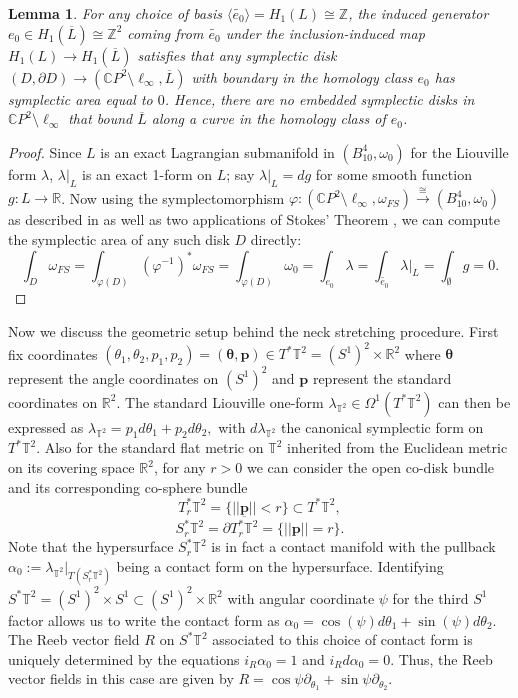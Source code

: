 \documentclass[10pt]{amsart}
\theoremstyle{plain}
\newtheorem{lemma}[thm]{Lemma}
\theoremstyle{definition}
\numberwithin{equation}{section}
\newcommand{\Z}{\mathbb{Z}}
\newcommand{\R}{\mathbb{R}}
\newcommand{\C}{\mathbb{C}}
\newcommand{\sse}{\subset}
\newcommand{\sm}{\setminus}
\newcommand{\wt}{\widetilde}
\begin{document}
\begin{lemma}\label{lem:exactgen}
    For any choice of basis $\langle \wt{e_0}\rangle =H_1(L)\cong \Z$, the induced generator $e_0\in H_1(\overline{L})\cong \Z^2$ coming from $\wt{e_0}$ under the inclusion-induced map $H_1(L)\to H_1(\overline{L})$ satisfies that any symplectic disk $(D,\partial D)\to (\C P^2\sm \ell_{\infty}, \overline{L})$ with boundary in the homology class $e_0$ has symplectic area equal to $0$. Hence, there are no embedded symplectic disks in $\C P^2\sm \ell_{\infty}$ that bound $\overline{L}$ along a curve in the homology class of $e_0$.
\end{lemma}

\begin{proof}
    Since $L$ is an exact Lagrangian submanifold in $(B^4_{10},\omega_0)$ for the Liouville form $\lambda$, $\lambda|_L$ is an exact 1-form on $L$; say $\lambda|_L = dg$ for some smooth function $g:L\to \R$. Now using the symplectomorphism $\varphi:(\C P^2\sm \ell_\infty,\omega_{FS})\overset{\cong}{\to} (B^4_{10}, \omega_0)$ as described in  as well as two applications of Stokes' Theorem \cite{Spivak79_DiffGeo}, we can compute the symplectic area of any such disk $D$ directly:
    $$\int_D \omega_{FS} = \int_{\varphi(D)} (\varphi^{-1})^*\omega_{FS} = \int_{\varphi(D)} \omega_0 = \int_{e_0} \lambda =\int_{\wt{e_0}} \lambda|_L = \int_\emptyset g = 0.$$ 
\end{proof}

Now we discuss the geometric setup behind the neck stretching procedure. First fix coordinates $(\theta_1,\theta_2,p_1,p_2) = (\boldsymbol{\theta},\mathbf{p})\in T^* \mathbb{T}^2 = (S^1)^2\times \R^2$ where $\boldsymbol{\theta}$ represent the angle coordinates on $(S^1)^2$ and $\mathbf{p}$ represent the standard coordinates on $\R^2$. The standard Liouville one-form $\lambda_{\mathbb{T}^2}\in \Omega^1(T^*\mathbb{T}^2)$ can then be expressed as $\lambda_{\mathbb{T}^2}=p_1 d\theta_1+p_2 d\theta_2,$
with $d\lambda_{\mathbb{T}^2}$ the canonical symplectic form on $T^* \mathbb{T}^2$. Also for the standard flat metric on $\mathbb{T}^2$ inherited from the Euclidean metric on its covering space $\R^2$, for any $r>0$ we can consider the open co-disk bundle and its corresponding co-sphere bundle
$$T^*_r \mathbb{T}^2 = \{||\mathbf{p}||<r\} \sse T^* \mathbb{T}^2,$$
$$S^*_r \mathbb{T}^2 = \partial \overline{T^*_r \mathbb{T}^2} =  \{||\mathbf{p}||=r\}.$$
Note that the hypersurface $S^*_r \mathbb{T}^2$ is in fact a contact manifold with the pullback $\alpha_0 :=\lambda_{\mathbb{T}^2}|_{T(S^*_r \mathbb{T}^2)}$ being a contact form on the hypersurface. Identifying $S^* \mathbb{T}^2 = (S^1)^2\times S^1 \sse (S^1)^2 \times \R^2$ with angular coordinate $\psi$ for the third $S^1$ factor allows us to write the contact form as $\alpha_0=\cos(\psi)d\theta_1+\sin(\psi)d\theta_2$. The Reeb vector field $R$ on $S^* \mathbb{T}^2$ associated to this choice of contact form is uniquely determined by the equations $i_R\alpha_0 = 1$ and $i_R d\alpha_0 = 0$. Thus, the Reeb vector fields in this case are given by $R=\cos{\psi}\partial_{\theta_1}+\sin{\psi}\partial_{\theta_2}$.
\end{document}
